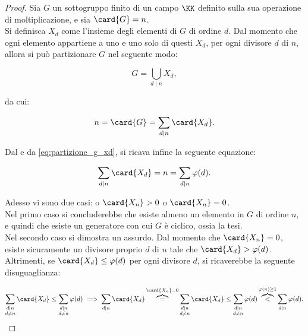 \begin{proof}
    Sia $G$ un sottogruppo finito di un campo $\KK$ definito
    sulla sua operazione di moltiplicazione, e sia
    $\card{G} = n$. \\

    Si definisca $X_d$ come l'insieme degli elementi di $G$
    di ordine $d$. Dal momento che ogni elemento appartiene
    a uno e uno solo di questi $X_d$, per ogni divisore
    $d$ di $n$, allora si può partizionare $G$ nel
    seguente modo:

    \begin{equation*}
        G = \bigcup_{d \mid n} X_d,
    \end{equation*}

    da cui:

    \begin{equation}
        \label{eq:partizione_g_xd}
        n = \card{G} = \sum_{d \mid n} \card{X_d}.
    \end{equation}

    \vskip 0.1in

    Dal  e da \eqref{eq:partizione_g_xd},
    si ricava infine la seguente equazione:

    \begin{equation}
        \label{eq:uguaglianza_xd}
        \sum_{d \mid n} \card{X_d} = n = \sum_{d \mid n} \varphi(d).
    \end{equation}

    Adesso vi sono due casi: o $\card{X_n} > 0$ o $\card{X_n} = 0$. \\

    Nel primo caso si concluderebbe che esiste almeno un elemento in
    $G$ di ordine $n$, e quindi che esiste un generatore con cui
    $G$ è ciclico, ossia la tesi. \\

    Nel secondo caso si dimostra un assurdo. Dal momento che
    $\card{X_n} = 0$, esiste sicuramente un divisore proprio
    $d$ di $n$ tale che $\card{X_d} > \varphi(d)$. Altrimenti,
    se $\card{X_d} \leq \varphi(d)$ per ogni divisore $d$,
    si ricaverebbe la seguente disuguaglianza:

    \[ \sum_{\substack{d \mid n \\ d \neq n}} \card{X_d} \leq \sum_{
            \substack{d \mid n \\ d \neq n}} \varphi(d) \implies \sum_{d \mid n} \card{X_d}
        \overbrace{=}^{\card{X_n}=0} \sum_{\substack{d \mid n \\ d \neq n}} \card{X_d}
        \leq \sum_{\substack{d \mid n \\ d \neq n}} \varphi(d)
        \overbrace{<}^{\varphi(n) \geq 1} \sum_{d \mid n} \varphi(d).\]


\end{proof}
